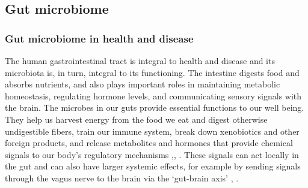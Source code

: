 \documentclass[12pt]{article}
\begin{document}
\subsection{Gut microbiome}

\subsubsection{Gut microbiome in health and disease}

The human gastrointestinal tract is integral to health and disease
and its microbiota is, in turn, integral to its functioning.
The intestine digests food and absorbs nutrients, and  
also plays important roles in maintaining metabolic homeostasis, 
regulating hormone levels, and communicating sensory signals with the brain.
The microbes in our guts provide essential functions to our well being. 
They help us harvest energy from the food we eat and digest otherwise 
undigestible fibers, train our immune system, break down xenobiotics and 
other foreign products, and release metabolites and hormones that provide 
chemical signals to our body's regulatory mechanisms \cite{nash-baker},\cite{asd-kb}, \cite{turnbaugh-energy_harvest-2006}. These signals can act locally in the gut 
and can also have larger systemic effects, for example by sending signals 
through the vagus nerve to the brain via the `gut-brain axis' \cite{asd-son}, \cite{asd-kb}. 
\end{document}
